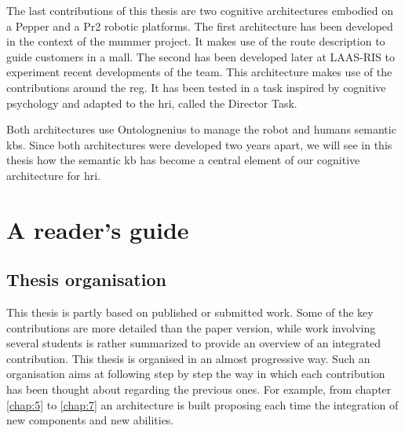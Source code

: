 The last contributions of this thesis are two cognitive architectures embodied on a Pepper and a Pr2 robotic platforms. The first architecture has been developed in the context of the \acrlong{mummer} project. It makes use of the route description to guide customers in a mall. The second has been developed later at LAAS-RIS to experiment recent developments of the team. This architecture makes use of the contributions around the \acrlong{reg}. It has been tested in a task inspired by cognitive psychology and adapted to the \acrlong{hri}, called the Director Task.

Both architectures use Ontolognenius to manage the robot and humans semantic \acrshort{kb}s. Since both architectures were developed two years apart, we will see in this thesis how the semantic \acrlong{kb} has become a central element of our cognitive architecture for \acrlong{hri}.

\section{A reader's guide}

\subsection*{Thesis organisation}

This thesis is partly based on published or submitted work. Some of the key contributions are more detailed than the paper version, while work involving several students is rather summarized to provide an overview of an integrated contribution.
This thesis is organised in an almost progressive way. Such an organisation aims at following step by step the way in which each contribution has been thought about regarding the previous ones. For example, from chapter \ref{chap:5} to \ref{chap:7} an architecture is built proposing each time the integration of new components and new abilities. 

